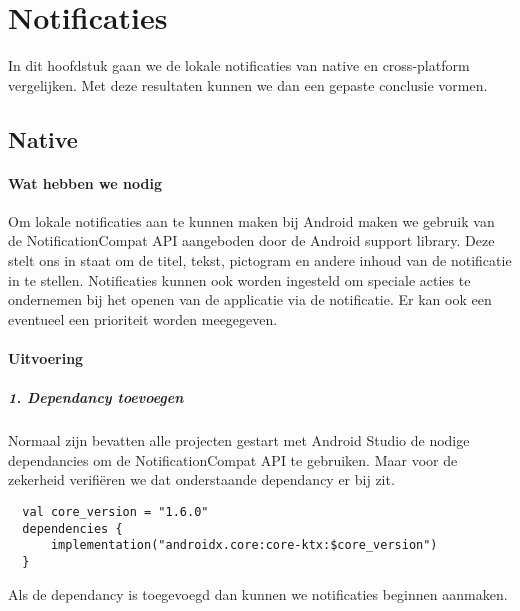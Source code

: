
\chapter{Notificaties}%
\label{ch:notificaties}

In dit hoofdstuk gaan we de lokale notificaties van native en cross-platform vergelijken. 
Met deze resultaten kunnen we dan een gepaste conclusie vormen.

\section{Native}
\subsubsection{Wat hebben we nodig}
Om lokale notificaties aan te kunnen maken bij Android maken we gebruik van de NotificationCompat API aangeboden 
door de Android support library. Deze stelt ons in staat om de titel, tekst, pictogram en andere inhoud van de 
notificatie in te stellen. Notificaties kunnen ook worden ingesteld om speciale acties te ondernemen bij het openen 
van de applicatie via de notificatie. Er kan ook een eventueel een prioriteit worden meegegeven.

\subsubsection{Uitvoering}
\paragraph{1. Dependancy toevoegen}
Normaal zijn bevatten alle projecten gestart met Android Studio de nodige dependancies om de NotificationCompat API
te gebruiken. Maar voor de zekerheid verifiëren we dat onderstaande dependancy er bij zit.
\begin{verbatim}
  val core_version = "1.6.0"
  dependencies {
      implementation("androidx.core:core-ktx:$core_version")
  }
\end{verbatim}
Als de dependancy is toegevoegd dan kunnen we notificaties beginnen aanmaken.

